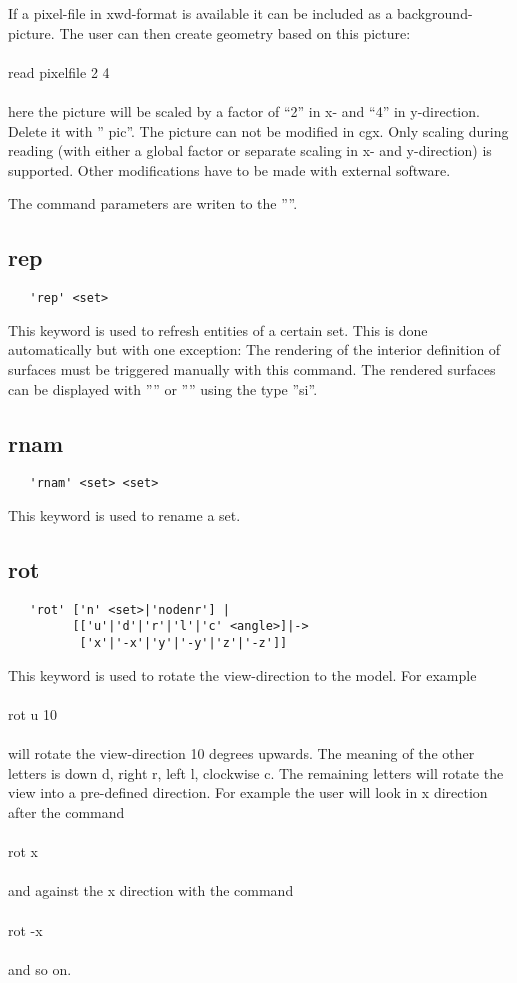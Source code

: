 \documentclass{article}
\begin{document}
If a pixel-file in xwd-format is available it can be included as a background-picture. The user can then create geometry based on this picture:\\\\read pixelfile 2 4\\\\here the picture will be scaled by a factor of ``2'' in x- and ``4'' in y-direction. Delete it with '' pic''. The picture can not be modified in cgx. Only scaling during reading (with either a global factor or separate scaling in x- and y-direction) is supported. Other modifications have to be made with external software.

The command parameters are writen to the ''''.

\subsection{\label{rep}rep}
\begin{verbatim}
   'rep' <set>  
\end{verbatim}
This keyword is used to refresh entities of a certain set. This is done automatically but with one exception: The rendering of the interior definition of surfaces must be triggered manually with this command. The rendered surfaces can be displayed with '''' or  '''' using the type ''si''.

\subsection{\label{rnam}rnam}
\begin{verbatim}
   'rnam' <set> <set>  
\end{verbatim}
This keyword is used to rename a set.

\subsection{\label{rot}rot}
\begin{verbatim}
   'rot' ['n' <set>|'nodenr'] |
         [['u'|'d'|'r'|'l'|'c' <angle>]|->
          ['x'|'-x'|'y'|'-y'|'z'|'-z']]
\end{verbatim}
This keyword is used to rotate the view-direction to the model. For example\\\\rot u 10\\\\will rotate the view-direction 10 degrees upwards. The meaning of the other letters is down d, right r, left l, clockwise c. The remaining letters will rotate the view into a pre-defined direction. For example the user will look in x direction after the command\\\\rot x\\\\and against the x direction with the command\\\\rot -x\\\\and so on.
\end{document}
